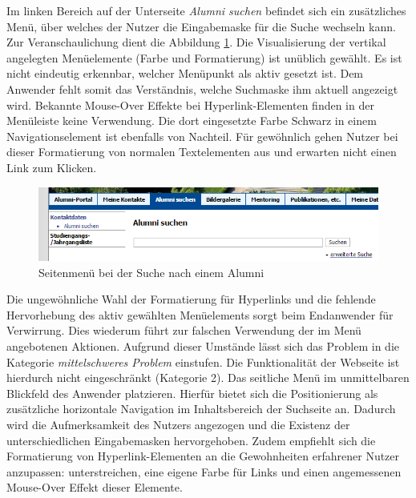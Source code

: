 {
	Im linken Bereich auf der Unterseite \emph{Alumni suchen} befindet sich ein zusätzliches Menü, über welches der Nutzer die Eingabemaske für die Suche wechseln kann. Zur Veranschaulichung dient die Abbildung \ref{fig:suche:seitlichesmenue}. Die Visualisierung der vertikal angelegten Menüelemente (Farbe und Formatierung) ist unüblich gewählt. Es ist nicht eindeutig erkennbar, welcher Menüpunkt als aktiv gesetzt ist. Dem Anwender fehlt somit das Verständnis, welche Suchmaske ihm aktuell angezeigt wird. Bekannte Mouse-Over Effekte bei Hyperlink-Elementen finden in der Menüleiste keine Verwendung. Die dort eingesetzte Farbe Schwarz in einem Navigationselement ist ebenfalls von Nachteil. Für gewöhnlich gehen Nutzer bei dieser Formatierung von normalen Textelementen aus und erwarten nicht einen Link zum Klicken.
	\begin{figure}[h]
		\centering
		\includegraphics[scale=0.75]{figures/seitliches_menue.png}
		\caption{Seitenmenü bei der Suche nach einem Alumni}
		\label{fig:suche:seitlichesmenue}
	\end{figure}
}
{
	Die ungewöhnliche Wahl der Formatierung für Hyperlinks und die fehlende Hervorhebung des aktiv gewählten Menüelements sorgt beim Endanwender für Verwirrung. Dies wiederum führt zur falschen Verwendung der im Menü angebotenen Aktionen. Aufgrund dieser Umstände lässt sich das Problem in die Kategorie \emph{mittelschweres Problem} einstufen. Die Funktionalität der Webseite ist hierdurch nicht eingeschränkt (Kategorie 2).
}
{
	Das seitliche Menü im unmittelbaren Blickfeld des Anwender platzieren. Hierfür bietet sich die Positionierung als zusätzliche horizontale Navigation im Inhaltsbereich der Suchseite an. Dadurch wird die Aufmerksamkeit des Nutzers angezogen und die Existenz der unterschiedlichen Eingabemasken hervorgehoben. Zudem empfiehlt sich die Formatierung von Hyperlink-Elementen an die Gewohnheiten erfahrener Nutzer anzupassen: unterstreichen, eine eigene Farbe für Links und einen angemessenen Mouse-Over Effekt dieser Elemente.
}
\label{prob:suche:seitenmenue}


